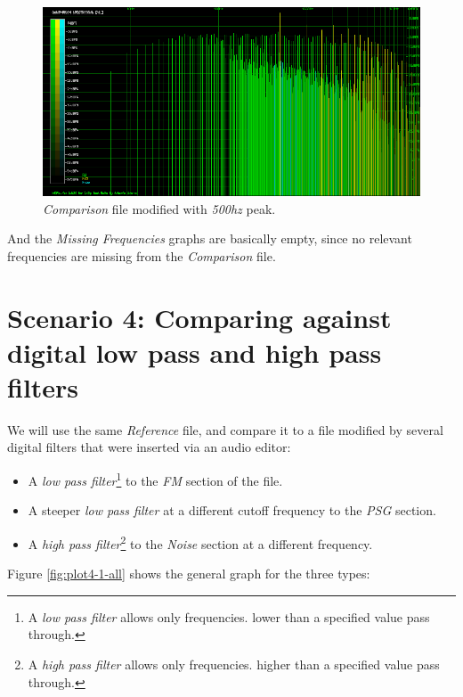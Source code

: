 \documentclass[10pt,a4paper]{report}
\newcommand{\hz}[1]{\textit{#1\acrshort{hz}}}
\begin{document}
\begin{figure}[H]
	\centering
	\includegraphics[width=1.0\linewidth]{images/interpretation/Plot3-Spectrogram-500hz.png}
	\caption[Reference File]{\textit{Comparison} file modified with \hz{500} peak.}
	\label{fig:plot3-spectrogram-500Hz}
\end{figure}


And the \textit{Missing Frequencies} graphs are basically empty, since no relevant frequencies are missing from the \textit{Comparison} file.

\section{Scenario 4: Comparing against digital low pass and high pass filters}

We will use the same \textit{Reference} file, and compare it to a file modified by several digital filters that were inserted via an audio editor:

\begin{itemize}
	\item A \textit{low pass filter}\footnote{A \textit{low pass filter} allows only frequencies. lower than a specified value pass through.} to the \textit{FM} section of the file.
	\item A steeper \textit{low pass filter} at a different cutoff frequency to the \textit{PSG} section.
	\item A \textit{high pass filter}\footnote{A \textit{high pass filter} allows only frequencies. higher than a specified value pass through.} to the \textit{Noise} section at a different frequency.
\end{itemize}

Figure \ref{fig:plot4-1-all} shows the general graph for the three types:
\end{document}
